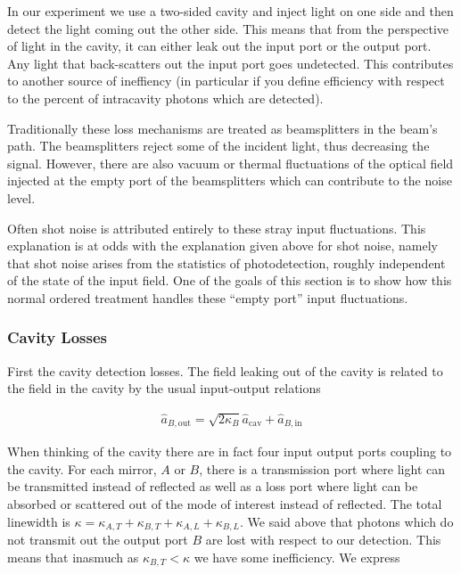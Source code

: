 \documentclass[12pt]{article}
\begin{document}
In our experiment we use a two-sided cavity and inject light on one side and then detect the light coming out the other side. This means that from the perspective of light in the cavity, it can either leak out the input port or the output port. Any light that back-scatters out the input port goes undetected. This contributes to another source of ineffiency (in particular if you define efficiency with respect to the percent of intracavity photons which are detected).

Traditionally these loss mechanisms are treated as beamsplitters in the beam's path. The beamsplitters reject some of the incident light, thus decreasing the signal. However, there are also vacuum or thermal fluctuations of the optical field injected at the empty port of the beamsplitters which can contribute to the noise level.

Often shot noise is attributed entirely to these stray input fluctuations. This explanation is at odds with the explanation given above for shot noise, namely that shot noise arises from the statistics of photodetection, roughly independent of the state of the input field. One of the goals of this section is to show how this normal ordered treatment handles these ``empty port'' input fluctuations.

\subsubsection{Cavity Losses}
First the cavity detection losses. The field leaking out of the cavity is related to the field in the cavity by the usual input-output relations \cite{Gardiner1985}

\begin{align}
\hat{a}_{B,\text{out}} = \sqrt{2\kappa_B} \hat{a}_{\text{cav}} + \hat{a}_{B,\text{in}}
\end{align}

When thinking of the cavity there are in fact four input output ports coupling to the cavity. For each mirror, $A$ or $B$, there is a transmission port where light can be transmitted instead of reflected as well as a loss port where light can be absorbed or scattered out of the mode of interest instead of reflected.
The total linewidth is $\kappa = \kappa_{A,T} + \kappa_{B,T} + \kappa_{A,L} + \kappa_{B,L}$.
 We said above that photons which do not transmit out the output port $B$ are lost with respect to our detection. This means that inasmuch as $\kappa_{B,T} < \kappa$ we have some inefficiency. We express
\end{document}
